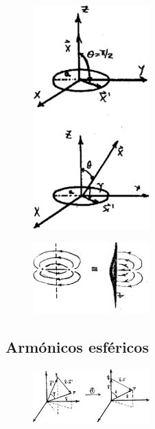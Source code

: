 \documentclass[10pt,oneside]{CBFT_book}
\begin{document}
\begin{figure}[htb]
	\begin{center}
	\includegraphics[width=0.4\textwidth]{images/fig_ft1_expansiones2.pdf}	 
	\end{center}
	\caption{}
\end{figure} 

\begin{figure}[htb]
	\begin{center}
	\includegraphics[width=0.4\textwidth]{images/fig_ft1_expansiones3.pdf}	 
	\end{center}
	\caption{}
\end{figure} 


\subsection{Armónicos esféricos}

\begin{figure}[htb]
	\begin{center}
	\includegraphics[width=0.4\textwidth]{images/fig_ft1_armesf1.pdf}	 
	\end{center}
	\caption{}
\end{figure} 
\end{document}
